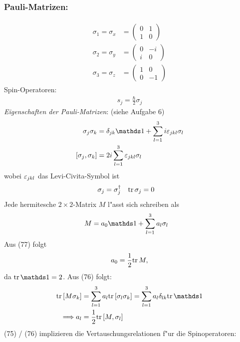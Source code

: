 \documentclass[a4paper]{scrartcl}
\begin{document}
{\subsubsection*{Pauli-Matrizen:}
\begin{align}
\begin{split}
\sigma_1 = \sigma_x & = \begin{pmatrix} 0 & 1 \\ 1& 0 \end{pmatrix} \\
\sigma_2 = \sigma_y & = \begin{pmatrix} 0 & -i \\ i & 0 \end{pmatrix} \\
\sigma_3 = \sigma_z & = \begin{pmatrix} 1 & 0 \\ 0& -1 \end{pmatrix}
\end{split}
\end{align}
Spin-Operatoren:
\begin{align}
s_j = \frac \hbar 2 \sigma_j
\end{align}
\emph{Eigenschaften der Pauli-Matrizen}: (siehe Aufgabe 6)
\begin{align}
\begin{split}
\sigma_j \sigma_k & = \delta_{jk} \dOne + \sum_{l=1}^3 i \eps_{jkl} \sigma_l \\
[\sigma_j, \sigma_k] & = 2i \sum_{l=1}^3 \eps_{jkl} \sigma_l
\end{split}
\end{align}
wobei $\varepsilon_{jkl}$ das Levi-Civita-Symbol ist
\begin{align}
\sigma_j &  = \sigma_j^\dagger &  \mathrm{tr} \, \sigma_j & = 0
\end{align}
Jede hermitesche $2 \times 2$-Matrix $M$ l"asst sich schreiben als
\begin{align}
M & = a_0 \dOne + \sum_{l=1}^3 a_l \sigma_l
\end{align}
Aus (77) folgt
\begin{align}
a_0 = \frac12 \mathrm{tr} \, M, 
\end{align}
da $\tr \dOne = 2$. Aus (76) folgt:
\begin{align}
\tr [ M \sigma_k] & = \sum_{l=1}^3 a_l \tr [\sigma_l \sigma_k]  = \sum_{l=1}^3 a_l \delta_{lk} \tr \dOne \notag \\
\Longrightarrow a_l & = \frac12 \tr[M, \sigma_l]
\end{align}
(75) / (76) implizieren die Vertauschungsrelationen f"ur die Spinoperatoren:
}
\end{document}
